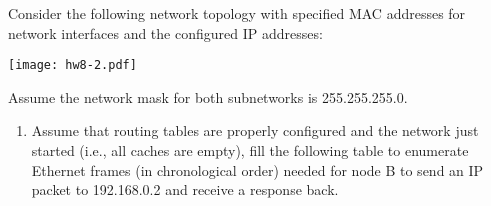 \documentclass{report}
\begin{document}
\begin{problem}
\begin{answer}{45em}
\begin{enumerate}
  \end{enumerate}
\end{answer}
\end{problem}

\clearpage

%
%
%
%

\begin{problem}

Consider the following network topology with specified MAC addresses for network interfaces and the configured IP addresses:

\begin{center}
  \texttt{[image: hw8-2.pdf]}
\end{center}

Assume the network mask for both subnetworks is 255.255.255.0.
\begin{enumerate}

  \item Assume that routing tables are properly configured and the network just
    started (i.e., all caches are empty), fill the following table to enumerate
    Ethernet frames (in chronological order) needed for node B to send an IP
    packet to 192.168.0.2 and receive a response back.


\end{enumerate}
\end{problem}
\end{document}
